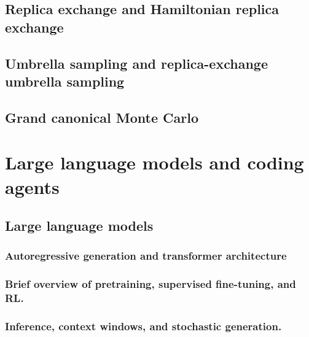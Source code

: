 \lipsum[1][1-3]

\subsection{Replica exchange and Hamiltonian replica exchange}

\lipsum[1][1-3]

\subsection{Umbrella sampling and replica-exchange umbrella sampling}

\lipsum[1][1-3]

\subsection{Grand canonical Monte Carlo} %

\lipsum[1][1-3]

\section{Large language models and coding agents}

\lipsum[1][1-3]

\subsection{Large language models}

\lipsum[1][1-3]

\subsubsection{Autoregressive generation and transformer architecture}

\lipsum[1][1-3]

\subsubsection{Brief overview of pretraining, supervised fine-tuning, and RL.}

\lipsum[1][1-3]

\subsubsection{ Inference, context windows, and stochastic generation.}

